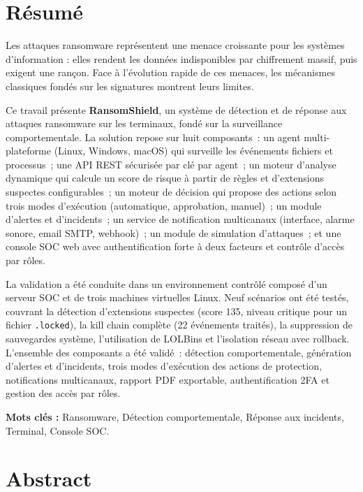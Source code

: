 \chapter*{Résumé}

Les attaques ransomware représentent une menace croissante pour les systèmes d'information : elles rendent les données indisponibles par chiffrement massif, puis exigent une rançon. Face à l'évolution rapide de ces menaces, les mécanismes classiques fondés sur les signatures montrent leurs limites.

Ce travail présente \textbf{RansomShield}, un système de détection et de réponse aux attaques ransomware sur les terminaux, fondé sur la surveillance comportementale. La solution repose sur huit composants~: un agent multi-plateforme (Linux, Windows, macOS) qui surveille les événements fichiers et processus~; une API REST sécurisée par clé par agent~; un moteur d'analyse dynamique qui calcule un score de risque à partir de règles et d'extensions suspectes configurables~; un moteur de décision qui propose des actions selon trois modes d'exécution (automatique, approbation, manuel)~; un module d'alertes et d'incidents~; un service de notification multicanaux (interface, alarme sonore, email SMTP, webhook)~; un module de simulation d'attaques~; et une console SOC web avec authentification forte à deux facteurs et contrôle d'accès par rôles.

La validation a été conduite dans un environnement contrôlé composé d'un serveur SOC et de trois machines virtuelles Linux. Neuf scénarios ont été testés, couvrant la détection d'extensions suspectes (score 135, niveau critique pour un fichier \texttt{.locked}), la kill chain complète (22 événements traités), la suppression de sauvegardes système, l'utilisation de LOLBins et l'isolation réseau avec rollback. L'ensemble des composants a été validé~: détection comportementale, génération d'alertes et d'incidents, trois modes d'exécution des actions de protection, notifications multicanaux, rapport PDF exportable, authentification 2FA et gestion des accès par rôles.

\textbf{Mots clés :} Ransomware, Détection comportementale, Réponse aux incidents, Terminal, Console SOC.


\newpage
\thispagestyle{empty}
\chapter*{Abstract}

